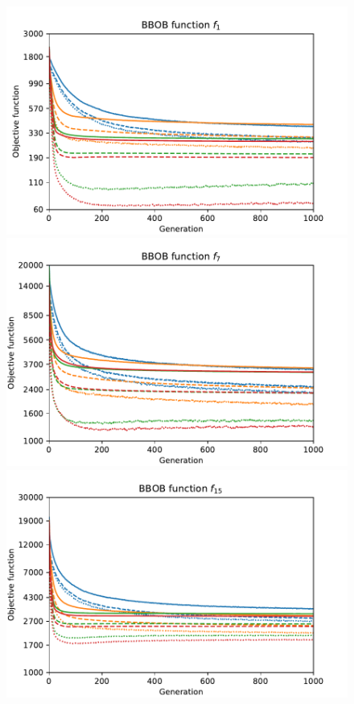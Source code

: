 \begin{figure}[ht!]
    \begin{minipage}[t]{0.32\textwidth}
        \centering
        \includegraphics[width=\textwidth]{img/runs/fitness_pso2011_f1.pdf}
    \end{minipage}
    \hfill
    \begin{minipage}[t]{0.32\textwidth}
        \centering
        \includegraphics[width=\textwidth]{img/runs/fitness_pso2011_f7.pdf}
    \end{minipage}
    \hfill
    \begin{minipage}[t]{0.32\textwidth}
        \centering
        \includegraphics[width=\textwidth]{img/runs/fitness_pso2011_f15.pdf}
    \end{minipage}


\end{figure}
